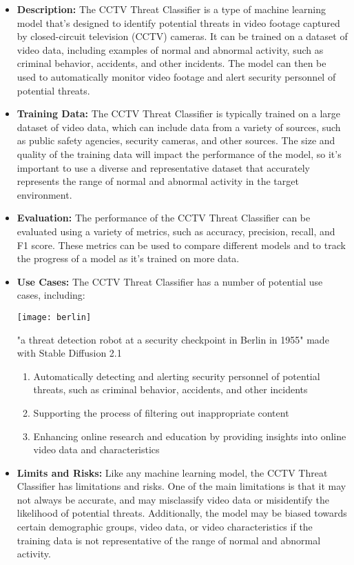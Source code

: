 \begin{itemize}
    \item \textbf{Description:} The CCTV Threat Classifier is a type of machine learning model that's designed to identify potential threats in video footage captured by closed-circuit television (CCTV) cameras. It can be trained on a dataset of video data, including examples of normal and abnormal activity, such as criminal behavior, accidents, and other incidents. The model can then be used to automatically monitor video footage and alert security personnel of potential threats.
    \item \textbf{Training Data:} The CCTV Threat Classifier is typically trained on a large dataset of video data, which can include data from a variety of sources, such as public safety agencies, security cameras, and other sources. The size and quality of the training data will impact the performance of the model, so it's important to use a diverse and representative dataset that accurately represents the range of normal and abnormal activity in the target environment.
    \item \textbf{Evaluation:} The performance of the CCTV Threat Classifier can be evaluated using a variety of metrics, such as accuracy, precision, recall, and F1 score. These metrics can be used to compare different models and to track the progress of a model as it's trained on more data.
    \item \textbf{Use Cases:} The CCTV Threat Classifier has a number of potential use cases, including:
\begin{marginfigure}[-5.5cm]
        \texttt{[image: berlin]}
        \caption{"a threat detection robot at a security checkpoint in Berlin in 1955" made with Stable Diffusion 2.1}
\end{marginfigure}
        \begin{enumerate}  
            \item Automatically detecting and alerting security personnel of potential threats, such as criminal behavior, accidents, and other incidents
            \item Supporting the process of filtering out inappropriate content
            \item Enhancing online research and education by providing insights into online video data and characteristics
        \end{enumerate}
    \item \textbf{Limits and Risks:} Like any machine learning model, the CCTV Threat Classifier has limitations and risks. One of the main limitations is that it may not always be accurate, and may misclassify video data or misidentify the likelihood of potential threats. Additionally, the model may be biased towards certain demographic groups, video data, or video characteristics if the training data is not representative of the range of normal and abnormal activity.

\end{itemize}
